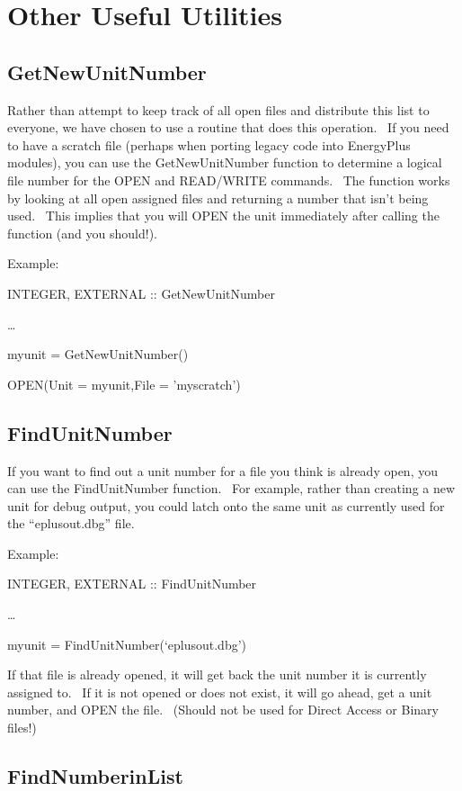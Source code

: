 \section{Other Useful Utilities}\label{other-useful-utilities}

\subsection{GetNewUnitNumber}\label{getnewunitnumber}

Rather than attempt to keep track of all open files and distribute this list to everyone, we have chosen to use a routine that does this operation.~ If you need to have a scratch file (perhaps when porting legacy code into EnergyPlus modules), you can use the GetNewUnitNumber function to determine a logical file number for the OPEN and READ/WRITE commands.~ The function works by looking at all open assigned files and returning a number that isn't being used.~ This implies that you will OPEN the unit immediately after calling the function (and you should!).

Example:

INTEGER, EXTERNAL :: GetNewUnitNumber

\ldots{}

myunit = GetNewUnitNumber()

OPEN(Unit = myunit,File = 'myscratch')

\subsection{FindUnitNumber}\label{findunitnumber}

If you want to find out a unit number for a file you think is already open, you can use the FindUnitNumber function.~ For example, rather than creating a new unit for debug output, you could latch onto the same unit as currently used for the ``eplusout.dbg'' file.

Example:

INTEGER, EXTERNAL :: FindUnitNumber

\ldots{}

myunit = FindUnitNumber(`eplusout.dbg')

If that file is already opened, it will get back the unit number it is currently assigned to.~ If it is not opened or does not exist, it will go ahead, get a unit number, and OPEN the file.~ (Should not be used for Direct Access or Binary files!)

\subsection{FindNumberinList}\label{findnumberinlist}

